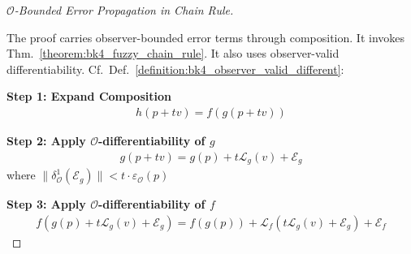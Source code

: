 \begin{proof}[$\mathcal{O}$-Bounded Error Propagation in Chain Rule]
\label{proof:bk4_sketch_sub_thresholds}
\leavevmode

The proof carries observer-bounded error terms through composition.
It invokes Thm.~\ref{theorem:bk4_fuzzy_chain_rule}.
It also uses observer-valid differentiability.
Cf.~Def.~\ref{definition:bk4_observer_valid_different}:

\textbf{Step 1: Expand Composition}
\begin{align}
h(p + tv) = f(g(p + tv))
\end{align}

\textbf{Step 2: Apply $\mathcal{O}$-differentiability of $g$}
\begin{align}
g(p + tv) = g(p) + t\mathcal{L}_g(v) + \mathcal{E}_g
\end{align}
where $\|\delta^1_{\mathcal{O}}(\mathcal{E}_g)\| < t \cdot \varepsilon_{\mathcal{O}}(p)$

\textbf{Step 3: Apply $\mathcal{O}$-differentiability of $f$}
\begin{align}
f(g(p) + t\mathcal{L}_g(v) + \mathcal{E}_g) = f(g(p)) + \mathcal{L}_f(t\mathcal{L}_g(v) + \mathcal{E}_g) + \mathcal{E}_f
\end{align}


\end{proof}
